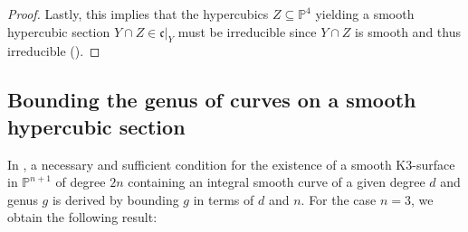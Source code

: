\documentclass[english,11pt,reqno]{amsart}
\newcommand{\sub}{\subseteq}
\newcommand{\Pfour}{\mathbb{P}^4}
\newcommand{\dd}{\mathfrak{c}}
\begin{document}
\begin{proof}
Lastly, this implies that the hypercubics $Z\sub \Pfour$ yielding a smooth hypercubic section $Y\cap Z\in \dd|_Y$ must be irreducible since $Y\cap Z$ is smooth and thus irreducible (). \par 
\end{proof}
%
%
%
%
%
%

%
\subsection{Bounding the genus of curves on a smooth hypercubic section} \label{subsection:bounding_genus}
%
In \cite[Thm. 1.1]{Knutsen-Smooth_curves_on_projective_K3_surface}, a necessary and sufficient condition for the existence of a smooth K3-surface in $\mathbb{P}^{n+1}$ of degree $2n$ containing an integral smooth curve of a given degree $d$ and genus $g$ is derived by bounding $g$ in terms of $d$ and $n$. For the case $n=3$, we obtain the following result:
\end{document}
